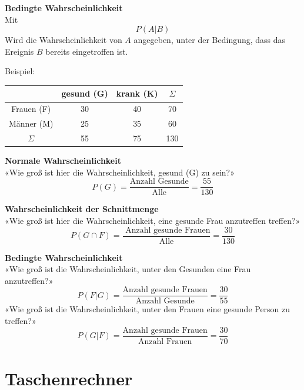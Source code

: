 \begin{multicols}{2}
\begin{tcolorbox}[colback=white]
  \textbf{Bedingte Wahrscheinlichkeit}\\
Mit
$$P(A|B)$$
Wird die Wahrscheinlichkeit von $A$ angegeben, unter der Bedingung,
dass das Ereignis $B$ bereits eingetroffen ist.
\end{tcolorbox}

Beispiel:

\begin{tabular}{c|c|c|c}
           & gesund (G)& krank (K)& $\Sigma$ \\\hline
Frauen (F) &        30 &       40 &       70 \\\hline
Männer (M) &        25 &       35 &       60 \\\hline
$\Sigma$   &        55 &       75 &      130 \\\hline
 \end{tabular}

\textbf{Normale Wahrscheinlichkeit}\\
«Wie groß ist hier die Wahrscheinlichkeit, gesund (G) zu sein?»
$$P(G) = \frac{\textrm{Anzahl Gesunde}}{\textrm{Alle}} =  \frac{55}{130}$$

\textbf{Wahrscheinlichkeit der Schnittmenge}\\
«Wie groß ist hier die Wahrscheinlichkeit, eine gesunde Frau anzutreffen treffen?»
$$P(G\cap F) = \frac{\textrm{\ Anzahl gesunde Frauen}}{\textrm{Alle}}= \frac{30}{130}$$

\textbf{Bedingte Wahrscheinlichkeit}\\
«Wie groß ist die Wahrscheinlichkeit, unter den Gesunden eine Frau anzutreffen?»
$$P(F | G) = \frac{\textrm{Anzahl gesunde Frauen}}{\textrm{Anzahl Gesunde}} =  \frac{30}{55}$$
«Wie groß ist die Wahrscheinlichkeit, unter den Frauen eine gesunde Person zu treffen?»
$$P(G | F) = \frac{\textrm{Anzahl gesunde Frauen}}{\textrm{Anzahl Frauen}}=  \frac{30}{70}$$


\end{multicols}


\newpage


\section*{Taschenrechner}

